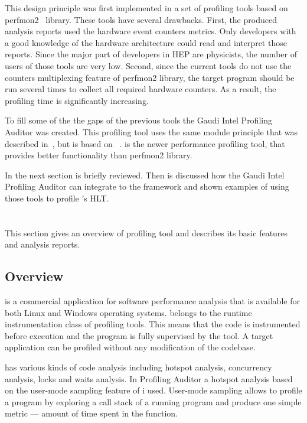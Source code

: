 This design principle was first implemented in a set of profiling tools based
on perfmon2~\cite{perfmon2} library. These tools have several drawbacks. First,
the produced analysis reports  used the  hardware event counters metrics. Only
developers with a good knowledge of the hardware  architecture could read and
interpret those reports. Since the major part of developers in HEP are
physicists, the number of users of those tools are very low. Second, since the
current tools do not use the counters multiplexing feature of perfmon2 library,
the target program should be run several times to collect all required hardware
counters. As a result, the profiling time is significantly increasing.

To fill some of the the gaps of the previous tools the Gaudi Intel
Profiling Auditor was created. This profiling tool uses the same module principle that was
described in~\cite{modular}, but is based on \iamp~\cite{vtune}.
\amp is the newer performance profiling tool, that provides better
functionality than perfmon2 library.

In the next section \iamp is briefly reviewed. Then is discussed how the Gaudi
Intel Profiling Auditor can integrate \amp to the \gaudi framework and shown
examples of using those tools to profile \lhcb's HLT.

\section[VTune Amplifier]{\iamp}
This section gives an overview of \iamp profiling tool and
describes its basic features and analysis reports.

\subsection{Overview}
\iamp is a commercial application for software performance analysis that is
available for both Linux and Windows operating systems. \amp belongs to the
runtime instrumentation class of profiling tools. This means that the code is
instrumented before execution and the program is fully supervised by the tool.
A target application can be profiled without any modification of the codebase.

\iamp has  various kinds of code analysis including hotspot analysis,
concurrency analysis, locks and waits analysis. In Profiling Auditor a
hotspot analysis based on the user-mode sampling feature of \amp i used.
User-mode sampling allows to profile a program by exploring a call stack of a
running program and produce one simple metric --- amount of time spent in the
function.

